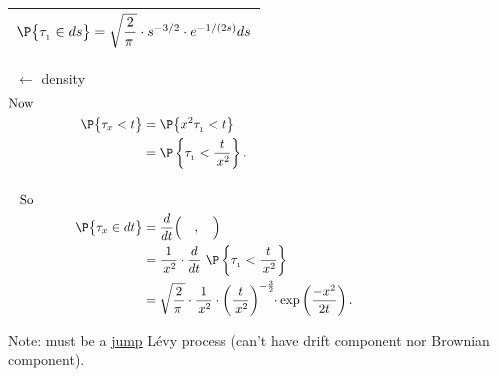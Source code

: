 \documentclass[12pt]{article}
\begin{document}
{\renewcommand{\arraystretch}{2.5}
\begin{tabular}{|c|}
\hline
$\P\big\{ \tau_{_1} \in ds \big\} = \sqrt{\dfrac{2}{\pi\,}} \cdot s^{-3/2} \cdot e^{-1/(2s)} ds$ \\[2mm] \hline
\end{tabular}}
\ $\leftarrow$ density \\ 

$$\begin{aligned} 
\text{Now} \hspace{30mm} \\
\P\big\{ \tau_x < t \big\} 
	&= \P\big\{ x^2\tau_{_1} < t \big\} \\
	&= \P\left\{ \tau_{_1} < \dfrac{t}{\,x^2} \right\}. \\ \\ 
\text{So} \hspace{30mm} \\
\P\big\{ \tau_x \in dt \big\} 
	&= \dfrac{d}{dt} \Big(\quad ,\quad \Big) \\
	&= \frac{1}{\,x^2} \cdot \dfrac{d}{dt}\  \P\left\{ \tau_{_1} < \dfrac{t}{\,x^2} \right\} \\
	&= \sqrt{\frac{2}{\pi\,}} \cdot \frac{1}{\,x^2}\cdot \left( \frac{t}{\,x^2} \right)^{-\frac{3}{2}} \!\!\cdot 
			\exp \left( \frac{-x^2}{2t} \right). \hspace{40mm}
\end{aligned}$$

\noindent 
Note: must be a \underline{jump} L\'evy process (can't have drift component nor Brownian component).
\end{document}
